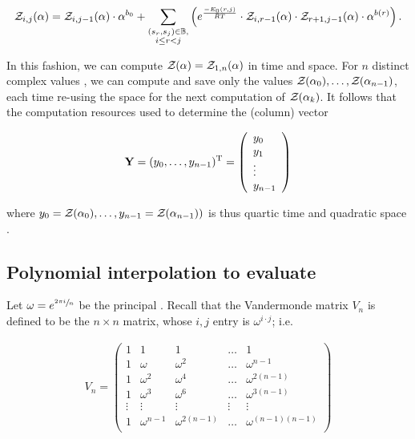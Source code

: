 \documentclass[11pt, oneside]{Thesis} %
\providecommand{\DIFadd}[1]{{\protect\color{blue}\uwave{#1}}} %
\providecommand{\DIFdel}[1]{{\protect\color{red}\sout{#1}}}                      %
\providecommand{\DIFaddbegin}{} %
\providecommand{\DIFaddend}{} %
\providecommand{\DIFdelbegin}{} %
\providecommand{\DIFdelend}{} %
\begin{document}
\begin{align}
\label{eq:fftbor:fftborNussPolyAlpha}
\emZof{i,j}{\alpha} = \emZof{i,j-1}{\alpha} \cdot \alpha^{b_0} +
\sum_{\substack{(s_r,s_j) \in \bpSet, \\ i \le r<j}}
\left(
\boltzNuss{r,j} \cdot
\emZof{i,r-1}{\alpha} \cdot \emZof{r+1,j-1}{\alpha} \cdot \alpha^{b(r)}
\right).
\end{align}

In this fashion, we can compute ${\mathcal Z}_{}(\alpha)={\mathcal Z}_{1,n}(\alpha)$ in
 time and  space. For $n$ distinct complex values
\alphaN, we can compute and save only the
values ${\mathcal Z}_{}(\alpha_0),\dots,{\mathcal Z}_{}(\alpha_{n-1})$, each time re-using the
 space for the next computation of ${\mathcal Z}_{}(\alpha_k)$. It follows that
the computation resources used to determine the (column) vector

\begin{align}
\label{eq:fftbor:yColumn}
\bfY = (y_0,\dots,y_{n-1})^{\text T} =
\left(
\begin{array}{l}
y_0 \\
y_1 \\
\vdots \\
y_{n-1} \\
\end{array}
\right)
\end{align}

where
\DIFdelbegin \DIFdel{$y_0={\mathcal Z}_{}(\alpha_0),\dots,y_{n-1}={\mathcal Z}_{}(\alpha_{n-1}))$ }\DIFdelend \DIFaddbegin \DIFadd{$y_0=\emZof{}{\alpha_0},\dots,y_{n-1}=\emZof{}{\alpha_{n-1}}$ }\DIFaddend is thus quartic time  and quadratic space .

\subsection{Polynomial interpolation to evaluate
\texorpdfstring{}{}}
\label{subsec:fftbor:fft}

Let $\omega = e^{\sfrac{2 \pi i}{n}}$ be the principal \nRoU.
Recall that the Vandermonde matrix $V_n$ is defined to be the
$n \times n$ matrix, whose $i,j$ entry is $\omega^{i \cdot j}$; i.e.

\begin{align}
\label{eq:fftbor:vandermonde}
V_n =
\left(
\begin{array}{rrrrr}
1 & 1 & 1 & \dots & 1 \\
1 & \omega & \omega^2 & \dots & \omega^{n-1} \\
1 & \omega^2 & \omega^4 & \dots & \omega^{2(n-1)} \\
1 & \omega^3 & \omega^6 & \dots & \omega^{3(n-1)} \\
\vdots & \vdots & \vdots & \vdots & \vdots \\
1 & \omega^{n-1} & \omega^{2(n-1)} & \dots & \omega^{(n-1)(n-1)} \\
\end{array}
\right)
\end{align}
\end{document}

